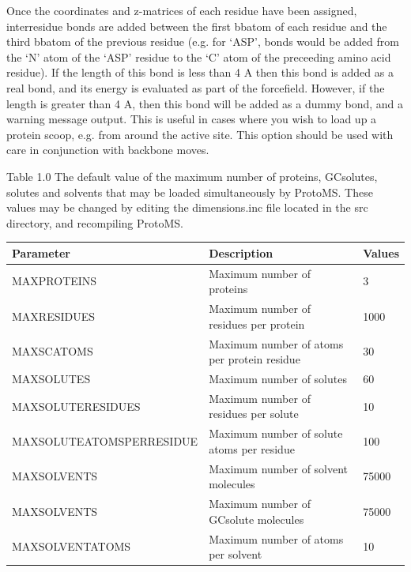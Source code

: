 \documentclass[letterpaper,10pt,english]{sphinxmanual}
\begin{document}
Once the coordinates and z-matrices of each residue have been assigned, interresidue bonds are added between the first bbatom of each residue and the third bbatom of the previous residue (e.g. for ‘ASP’, bonds would be added from the ‘N’ atom of the ‘ASP’ residue to the ‘C’ atom of the preceeding amino acid residue). If the length of this bond is less than 4 A then this bond is added as a real bond, and its energy is evaluated as part of the forcefield. However, if the length is greater than 4 A, then this bond will be added as a dummy bond, and a warning message output. This is useful in cases where you wish to load up a protein scoop, e.g. from around the active site. This option should be used with care in conjunction with backbone moves.


\begin{threeparttable}
\capstart\caption{Table 1.0 The default value of the maximum number of proteins, GCsolutes, solutes and solvents that may be loaded simultaneously by ProtoMS. These values may be changed by editing the dimensions.inc file located in the src directory, and recompiling ProtoMS.}

\begin{tabulary}{\linewidth}{|L|L|L|}
\hline
\textsf{\relax 
Parameter
} & \textsf{\relax 
Description
} & \textsf{\relax 
Values
}\\
\hline
MAXPROTEINS
 & 
Maximum number of proteins
 & 
3
\\
\hline
MAXRESIDUES
 & 
Maximum number of residues per protein
 & 
1000
\\
\hline
MAXSCATOMS
 & 
Maximum number of atoms per protein residue
 & 
30
\\
\hline
MAXSOLUTES
 & 
Maximum number of solutes
 & 
60
\\
\hline
MAXSOLUTERESIDUES
 & 
Maximum number of residues per solute
 & 
10
\\
\hline
MAXSOLUTEATOMSPERRESIDUE
 & 
Maximum number of solute atoms per residue
 & 
100
\\
\hline
MAXSOLVENTS
 & 
Maximum number of solvent molecules
 & 
75000
\\
\hline
MAXSOLVENTS
 & 
Maximum number of GCsolute molecules
 & 
75000
\\
\hline
MAXSOLVENTATOMS
 & 
Maximum number of atoms per solvent
 & 
10
\\
\hline\end{tabulary}

\end{threeparttable}
\end{document}
